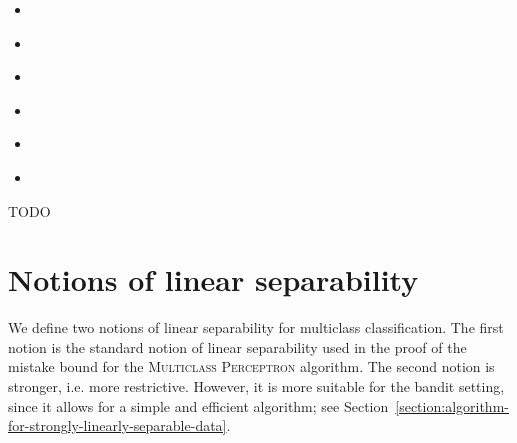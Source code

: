 \documentclass[12pt]{article}
\begin{document}
\begin{itemize}
\item \cite{Abernethy-Rakhlin-2009}

\item \cite{Chen-Chen-Zhang-Chen-Zhang-2009}

\item \cite{Hazan-Kale-2011}

\item \cite{Beygelzimer-Orabona-Zhang-2017}

\item \cite{Foster-Kale-Luo-Mohri-Sridharan-2018}

\item \cite{Foster-Krishnamurthy-2018}
\end{itemize}


TODO


\section{Notions of linear separability}
\label{section:notions-of-linear-separability}

We define two notions of linear separability for multiclass classification. The
first notion is the standard notion of linear separability used in the proof of
the mistake bound for the \textsc{Multiclass Perceptron} algorithm. The second
notion is stronger, i.e. more restrictive. However, it is more suitable for the
bandit setting, since it allows for a simple and efficient algorithm; see
Section~\ref{section:algorithm-for-strongly-linearly-separable-data}.
\end{document}
